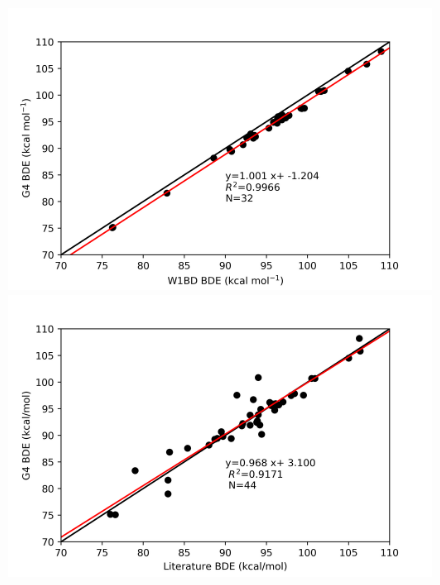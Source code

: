 \begin{figure}
\hspace*{-1.5cm}
\begin{minipage}{8cm}
  \centering
  \includegraphics[width=\textwidth]{figures/w1bd-g4}
\end{minipage}%
\begin{minipage}{8cm}
  \centering
  \includegraphics[width=\textwidth]{figures/lit-g4}
\end{minipage}
\end{figure}

